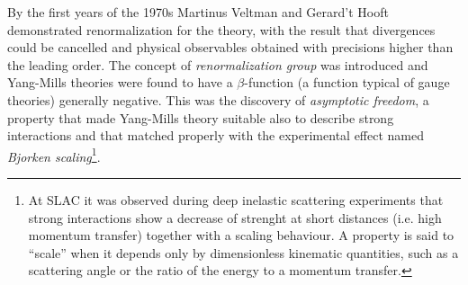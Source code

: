By the first years of the 1970s Martinus Veltman and Gerard't Hooft demonstrated renormalization for the theory, with the result that divergences could be cancelled and physical observables obtained with precisions higher than the leading order. 
The concept of \textit{renormalization group} was introduced and Yang-Mills theories were found to have a $\beta$-function (a function typical of gauge theories) generally negative. This was the discovery of \textit{asymptotic freedom}, a property that made Yang-Mills theory suitable also to describe strong interactions and that matched properly with the experimental effect named \textit{Bjorken scaling}\footnote{At SLAC it was observed during deep inelastic scattering experiments that strong interactions show a decrease of strenght at short distances (i.e. high momentum transfer) together with a scaling behaviour. A property is said to ``scale'' when it depends only by dimensionless kinematic quantities, such as a scattering angle or the ratio of the energy to a momentum transfer.}. 

